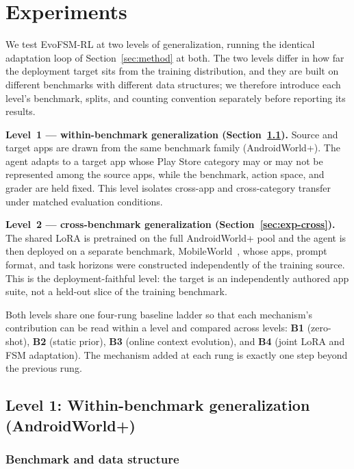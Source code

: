 \section{Experiments}
\label{sec:exp}

We test EvoFSM-RL at two levels of generalization, running the identical
adaptation loop of Section~\ref{sec:method} at both. The two levels differ in
how far the deployment target sits from the training distribution, and they
are built on different benchmarks with different data structures; we therefore
introduce each level's benchmark, splits, and counting convention separately
before reporting its results.

\textbf{Level~1 --- within-benchmark generalization (Section~\ref{sec:exp-within}).}
Source and target apps are drawn from the same benchmark family
(AndroidWorld+). The agent adapts to a target app whose Play Store category may
or may not be represented among the source apps, while the benchmark, action
space, and grader are held fixed. This level isolates cross-app and
cross-category transfer under matched evaluation conditions.

\textbf{Level~2 --- cross-benchmark generalization (Section~\ref{sec:exp-cross}).}
The shared LoRA is pretrained on the full AndroidWorld+ pool and the agent is
then deployed on a separate benchmark, MobileWorld~\citep{mobileworld2025},
whose apps, prompt format, and task horizons were constructed independently of
the training source. This is the deployment-faithful level: the target is an
independently authored app suite, not a held-out slice of the training
benchmark.

Both levels share one four-rung baseline ladder so that each mechanism's
contribution can be read within a level and compared across levels:
\textbf{B1} (zero-shot), \textbf{B2} (static prior), \textbf{B3} (online
context evolution), and \textbf{B4} (joint LoRA and FSM adaptation). The
mechanism added at each rung is exactly one step beyond the previous rung.

\subsection{Level 1: Within-benchmark generalization (AndroidWorld+)}
\label{sec:exp-within}

\subsubsection{Benchmark and data structure}
\label{sec:exp-within-data}

